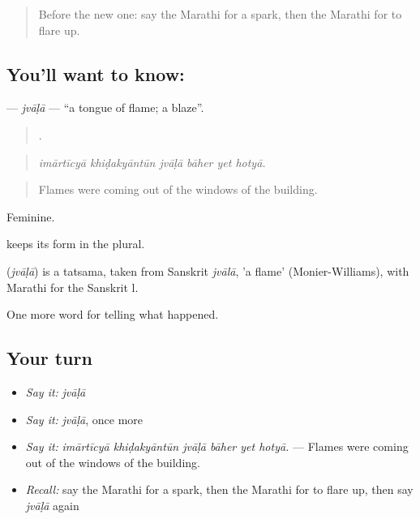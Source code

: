 \label{lesson:MR-C292-jvala}



\begin{quote}
Before the new one: say the Marathi for a spark, then the Marathi for to flare up.
\end{quote}

\subsection*{You'll want to know: }
\textbf{} — \emph{jvāḷā} — \textquotedblleft{}a tongue of flame; a blaze\textquotedblright{}.

\begin{quote}
     .
\end{quote}

\begin{quote}
\emph{imārtīcyā khiḍakyāntūn jvāḷā bāher yet hotyā.}
\end{quote}

\begin{quote}
Flames were coming out of the windows of the building.
\end{quote}

Feminine.

 keeps its form in the plural.

\begin{cousinweb}
\textbf{} (\emph{jvāḷā}) is a tatsama, taken from Sanskrit \emph{jvālā}, 'a flame' (Monier-Williams), with Marathi  for the Sanskrit l.
\end{cousinweb}

\begin{grammarlens}[title={What you've built}]
One more word for telling what happened.
\end{grammarlens}

\subsection*{Your turn}
\begin{itemize}
\raggedright
  \item \emph{Say it:} \emph{jvāḷā}
  \item \emph{Say it:} \emph{jvāḷā}, once more
  \item \emph{Say it:} \emph{imārtīcyā khiḍakyāntūn jvāḷā bāher yet hotyā.} — Flames were coming out of the windows of the building.
  \item \emph{Recall:} say the Marathi for a spark, then the Marathi for to flare up, then say \emph{jvāḷā} again
\end{itemize}

